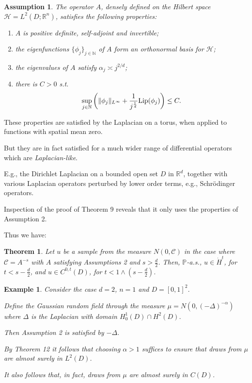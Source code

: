 \documentclass[oneside,11pt]{book}
\numberwithin{equation}{section}
\newtheorem{assumption}{Assumption}[section]
\newtheorem{theorem}{Theorem}[section]
\newtheorem{example}{Example}[section]
\begin{document}
\begin{assumption}
    The operator $A$, densely defined on the Hilbert space $\mathcal{H} = L^2(D;\mathbb{R}^n)$, satisfies the following properties:
    \begin{enumerate}
        \item $A$ is positive definite, self-adjoint and invertible;
        \item the eigenfunctions $\{\phi_j\}_{j\in\mathbb{N}}$ of $A$ form an orthonormal basis for $\mathcal{H}$;
        \item the eigenvalues of $A$ satisfy $\alpha_j\asymp j^{2/d}$;
        \item there is $C > 0$ s.t.
        \begin{align*}
            \sup_{j\in\mathbb{N}} \left(\|\phi_j\|_{L^\infty} + \frac{1}{j^{\frac{1}{d}}}{\rm Lip}(\phi_j)\right)\le C.
        \end{align*}
    \end{enumerate}
\end{assumption}
These properties are satisfied by the Laplacian on a torus, when applied to functions with spatial mean zero.

But they are in fact satisfied for a much wider range of differential operators which are \textit{Laplacian-like}.

E.g., the Dirichlet Laplacian on a bounded open set $D$ in $\mathbb{R}^d$, together with various Laplacian operators perturbed by lower order terms, e.g., Schr\"odinger operators.

Inspection of the proof of Theorem 9 reveals that it only uses the properties of Assumption 2.

Thus we have:

\begin{theorem}
    Let $u$ be a sample from the measure $N(0,\mathcal{C})$ in the case where $\mathcal{C} = A^{-s}$ with $A$ satisfying Assumptions 2 and $s > \frac{d}{2}$. Then, $\mathbb{P}$-a.s., $u\in\dot{H}^t$, for $t < s - \frac{d}{2}$, and $u\in C^{0,t}(D)$, for $t < 1\wedge\left(s - \frac{d}{2}\right)$.
\end{theorem}

\begin{example}
    Consider the case $d = 2$, $n = 1$ and $D = [0,1]^2$.
    
    Define the Gaussian random field through the measure $\mu = N(0,(-\Delta)^{-\alpha})$ where $\Delta$ is the Laplacian with domain $H_0^1(D)\cap H^2(D)$.
    
    Then Assumption 2 is satisfied by $-\Delta$.
    
    By Theorem 12 it follows that choosing $\alpha > 1$ suffices to ensure that draws from $\mu$ are almost surely in $L^2(D)$.
    
    It also follows that, in fact, draws from $\mu$ are almost surely in $C(D)$.
\end{example}
\end{document}
